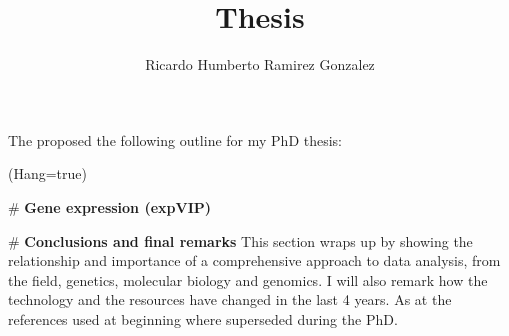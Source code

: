 \documentclass[12pt,a4paper]{book}
\author{Ricardo Humberto Ramirez Gonzalez}
\title{Thesis}
\begin{document}









The proposed the following outline for my PhD thesis:

\begin{easylist}
	\ListProperties(Hang=true)


	 
	# \textbf{Gene expression (expVIP)}  
	
	# \textbf{Conclusions and final remarks} This section wraps up by showing the relationship and importance of a comprehensive approach to data analysis, from the field, genetics, molecular biology and genomics. I will also remark how the technology and the resources have changed in the last 4 years. As at the references used at beginning where superseded during the PhD. 
\end{easylist}



\end{document}
